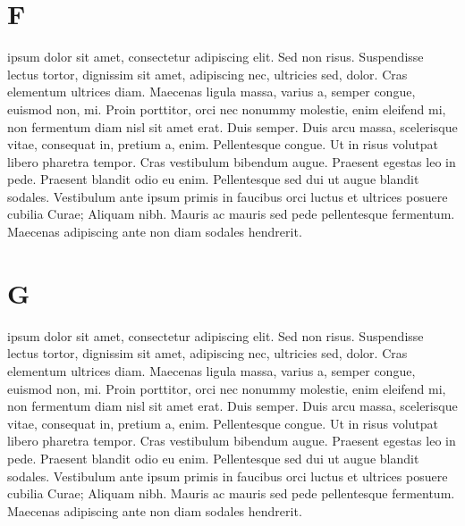 \documentclass{article}
\begin{document}
\pend

\section{F}



\pstart
{}       ipsum dolor sit amet, consectetur adipiscing elit. Sed non risus. Suspendisse lectus tortor, dignissim sit amet, adipiscing nec, ultricies sed, dolor. Cras elementum ultrices diam. Maecenas ligula massa, varius a, semper congue, euismod non, mi. Proin porttitor, orci nec nonummy molestie, enim  eleifend mi, non fermentum diam nisl sit amet erat. Duis semper. Duis arcu massa, scelerisque vitae, consequat in, pretium a, enim. Pellentesque congue. Ut in risus volutpat libero pharetra tempor. Cras vestibulum bibendum augue. Praesent egestas leo in pede. Praesent blandit odio eu enim. Pellentesque sed dui ut augue blandit sodales. Vestibulum ante ipsum primis in faucibus orci luctus et ultrices posuere cubilia Curae; Aliquam nibh. Mauris ac mauris sed pede pellentesque fermentum. Maecenas adipiscing ante non diam sodales hendrerit. 

\pend


\section{G}



\pstart
{}       ipsum dolor sit amet, consectetur adipiscing elit. Sed non risus. Suspendisse lectus tortor, dignissim sit amet, adipiscing nec, ultricies sed, dolor. Cras elementum ultrices diam. Maecenas ligula massa, varius a, semper congue, euismod non, mi. Proin porttitor, orci nec nonummy molestie, enim  eleifend mi, non fermentum diam nisl sit amet erat. Duis semper. Duis arcu massa, scelerisque vitae, consequat in, pretium a, enim. Pellentesque congue. Ut in risus volutpat libero pharetra tempor. Cras vestibulum bibendum augue. Praesent egestas leo in pede. Praesent blandit odio eu enim. Pellentesque sed dui ut augue blandit sodales. Vestibulum ante ipsum primis in faucibus orci luctus et ultrices posuere cubilia Curae; Aliquam nibh. Mauris ac mauris sed pede pellentesque fermentum. Maecenas adipiscing ante non diam sodales hendrerit. 
\end{document}
